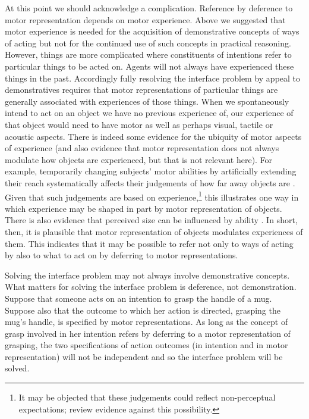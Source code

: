 \documentclass[12pt,\papersize]{extarticle}
\begin{document}
At this point we should acknowledge a complication.  Reference by deference to motor representation depends on motor experience.  Above we suggested that motor experience is needed for the acquisition of demonstrative concepts of ways of acting but not for the continued use of such concepts in practical reasoning.  However, things are more complicated where constituents of intentions refer to particular things to be acted on.  Agents will not always have experienced these things in the past.  Accordingly fully resolving the interface problem by appeal to demonstratives requires that motor representations of particular things are generally associated with experiences of those things.  When we spontaneously intend to act on an object we have no previous experience of, our experience of that object would need to have motor as well as perhaps visual, tactile or acoustic aspects.  There is indeed some evidence for the ubiquity of motor aspects of experience (and also evidence that motor representation does not always modulate how objects are experienced, but that is not relevant here).  For example, temporarily changing subjects' motor abilities by artificially extending their reach systematically affects their judgements of how far away objects are \citep{linkenauger:2009_effects, costantini2011tool}. Given that such judgements are based on experience,\footnote{
It may be objected that these judgements could reflect non-perceptual expectations; \citet[pp.\ 203-4]{witt:2011_action} review evidence against this possibility.} 
this illustrates one way in which experience may be shaped in part by motor representation of objects.  There is also evidence that perceived size can be influenced by ability \citep[e.g.][]{witt2009kicking}.  In short, then, it is plausible that motor representation of objects modulates experiences of them.  This indicates that it may be possible to refer not only to ways of acting by also to what to act on by deferring to motor representations.

Solving the interface problem may not always involve demonstrative concepts. What matters for solving the interface problem is deference, not demonstration. Suppose that someone acts on an intention to grasp the handle of a mug.  Suppose also that the outcome to which her action is directed, grasping the mug's handle, is specified by motor representations. As long as the concept of grasp involved in her intention refers by deferring to a motor representation of grasping, the two specifications of action outcomes (in intention and in motor representation) will not be independent and so the interface problem will be solved.
\end{document}
